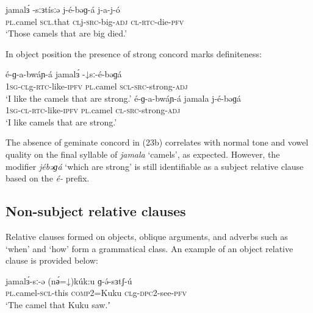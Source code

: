 \ea \gll jamalɜ́		-sːɜtísːə	j-é-bəɡ-á	j-a-j-ó\\
 		\textsc{pl}.camel	\textsc{scl}.that	\textsc{cl}j-\textsc{src}-big-\textsc{adj}	\textsc{cl}-\textsc{rtc}-die-\textsc{pfv}\\
 	\glt	‘Those camels that are big died.’
\z 

In object position the presence of strong concord marks definiteness:

\ea 
	\ea \gll	é-ɡ-a-bwáɲ-á		jamalɜ́		-↓sː-é-bəɡá\\
 				1\textsc{sg}-\textsc{cl}g-\textsc{rtc}-like-\textsc{\textsc{ipfv}}	\textsc{pl}.camel	\textsc{scl}-\textsc{src}-strong-\textsc{adj}\\
 		\glt 	‘I like the camels that are strong.’
	\ex \gll	 é-ɡ-a-bwáɲ-á	jamala		j-é-bəɡá\\
 			1\textsc{sg}-\textsc{cl}-\textsc{rtc}-like-\textsc{\textsc{ipfv}}	\textsc{pl}.camel	\textsc{cl}-\textsc{src}-strong-\textsc{adj}\\
 		\glt ‘I like camels that are strong.’
	\z
\z

The absence of geminate concord in (23b) correlates with normal tone and vowel quality on the final syllable of \textit{jamala} ‘camels’, as expected. However, the modifier \textit{jébəɡá} ‘which are strong’ is still identifiable as a subject relative clause based on the \textit{é-} prefix. 


\subsection{Non-subject relative clauses}\label{nonsubjectrelative}

Relative clauses formed on objects, oblique arguments, and adverbs such as `when' and `how' form a grammatical class. An example of an object relative clause is provided below:

\ea 	\gll  jamalɜ́-sː-ə		(nә́=↓)kúk:u		ɡ-ə́-sɜtʃ-ú 	\\
 			\textsc{pl}.camel-\textsc{scl}-this 	\textsc{comp}2=Kuku	\textsc{cl}g-\textsc{dpc}2-see-\textsc{pfv}	\\
		\glt ‘The camel that Kuku saw.ʼ
\z 

